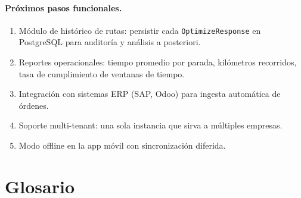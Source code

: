 \documentclass[12pt,a4paper,oneside]{article}
\begin{document}
\paragraph{Pr\'oximos pasos funcionales.}
\begin{enumerate}[leftmargin=*]
  \item M\'odulo de hist\'orico de rutas: persistir cada \texttt{OptimizeResponse} en PostgreSQL para auditor\'ia y an\'alisis a posteriori.
  \item Reportes operacionales: tiempo promedio por parada, kil\'ometros recorridos, tasa de cumplimiento de ventanas de tiempo.
  \item Integraci\'on con sistemas ERP (SAP, Odoo) para ingesta autom\'atica de \'ordenes.
  \item Soporte multi-tenant: una sola instancia que sirva a m\'ultiples empresas.
  \item Modo offline en la app m\'ovil con sincronizaci\'on diferida.
\end{enumerate}

\appendix

\section{Glosario}
\end{document}
